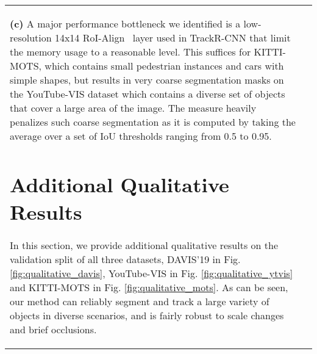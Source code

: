 \documentclass[runningheads]{llncs}
\begin{document}
\begin{table}[t]
\begin{subtable}[t]{0.36\linewidth}
{\begin{tabular}[t]{lr}{\scriptsize\textbf{(c)}}
A major performance bottleneck we identified is a low-resolution 14x14 RoI-Align~\cite{He17ICCV} layer used in TrackR-CNN that limit the memory usage to a reasonable level. This suffices for KITTI-MOTS, which contains small pedestrian instances and cars with simple shapes, but results in very coarse segmentation masks on the YouTube-VIS dataset which contains a diverse set of objects that cover a large area of the image. The  measure heavily penalizes such coarse segmentation as it is computed by taking the average over a set of IoU thresholds ranging from 0.5 to 0.95.



\section{Additional Qualitative Results}
\label{sec:qualitative}

In this section, we provide additional qualitative results on the validation split of all three datasets, DAVIS'19 \cite{Caelles19arXiv} in Fig. \ref{fig:qualitative_davis}, YouTube-VIS \cite{Yang19ICCV} in Fig. \ref{fig:qualitative_ytvis} and KITTI-MOTS \cite{Voigtlaender19CVPR} in Fig. \ref{fig:qualitative_mots}. As can be seen, our method can reliably segment and track a large variety of objects in diverse scenarios, and is fairly robust to scale changes and brief occlusions. 



\end{tabular}}
\end{subtable}
\end{table}
\end{document}
